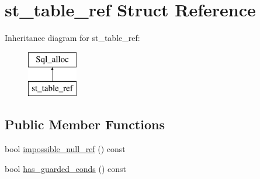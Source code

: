 \hypertarget{structst__table__ref}{}\section{st\+\_\+table\+\_\+ref Struct Reference}
\label{structst__table__ref}
Inheritance diagram for st\+\_\+table\+\_\+ref\+:\begin{figure}[H]
\begin{center}
\leavevmode
\includegraphics[height=2.000000cm]{structst__table__ref}
\end{center}
\end{figure}
\subsection*{Public Member Functions}
\begin{DoxyCompactItemize}
\item 
bool \mbox{\hyperlink{structst__table__ref_ad15491c9abe01eed929d9afb0b077607}{impossible\+\_\+null\+\_\+ref}} () const
\item 
bool \mbox{\hyperlink{structst__table__ref_a19dc04ec0d9bf489736d803dd15945f0}{has\+\_\+guarded\+\_\+conds}} () const
\end{DoxyCompactItemize}
